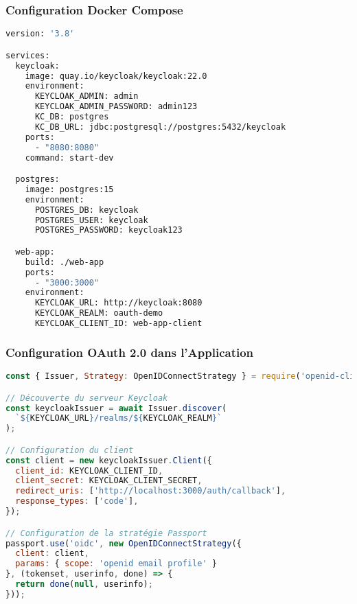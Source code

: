 \documentclass[aspectratio=169]{beamer}
\begin{document}
\begin{frame}[fragile]
    \frametitle{Configuration Docker Compose}
    \begin{lstlisting}[language=bash, caption=Configuration des services]
version: '3.8'

services:
  keycloak:
    image: quay.io/keycloak/keycloak:22.0
    environment:
      KEYCLOAK_ADMIN: admin
      KEYCLOAK_ADMIN_PASSWORD: admin123
      KC_DB: postgres
      KC_DB_URL: jdbc:postgresql://postgres:5432/keycloak
    ports:
      - "8080:8080"
    command: start-dev

  postgres:
    image: postgres:15
    environment:
      POSTGRES_DB: keycloak
      POSTGRES_USER: keycloak
      POSTGRES_PASSWORD: keycloak123

  web-app:
    build: ./web-app
    ports:
      - "3000:3000"
    environment:
      KEYCLOAK_URL: http://keycloak:8080
      KEYCLOAK_REALM: oauth-demo
      KEYCLOAK_CLIENT_ID: web-app-client
    \end{lstlisting}
\end{frame}

\begin{frame}[fragile]
    \frametitle{Configuration OAuth 2.0 dans l'Application}
    \begin{lstlisting}[language=JavaScript, caption=Configuration Passport.js]
const { Issuer, Strategy: OpenIDConnectStrategy } = require('openid-client');

// Découverte du serveur Keycloak
const keycloakIssuer = await Issuer.discover(
  `${KEYCLOAK_URL}/realms/${KEYCLOAK_REALM}`
);

// Configuration du client
const client = new keycloakIssuer.Client({
  client_id: KEYCLOAK_CLIENT_ID,
  client_secret: KEYCLOAK_CLIENT_SECRET,
  redirect_uris: ['http://localhost:3000/auth/callback'],
  response_types: ['code'],
});

// Configuration de la stratégie Passport
passport.use('oidc', new OpenIDConnectStrategy({
  client: client,
  params: { scope: 'openid email profile' }
}, (tokenset, userinfo, done) => {
  return done(null, userinfo);
}));
    \end{lstlisting}
\end{frame}
\end{document}
